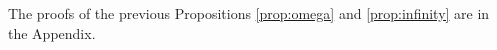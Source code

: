 
The proofs of the previous Propositions \ref{prop:omega} and \ref{prop:infinity} are in the Appendix. 

